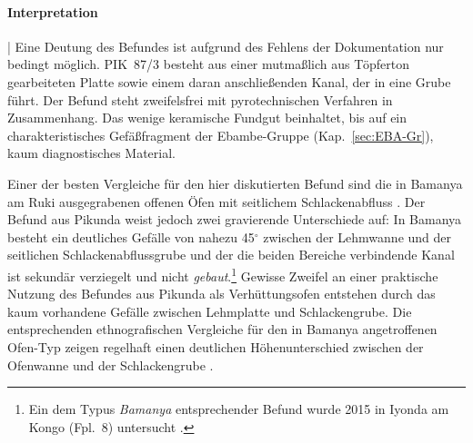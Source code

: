 \paragraph{Interpretation}\hspace{-.5em}|\hspace{.5em}%
Eine Deutung des Befundes ist aufgrund des Fehlens der Dokumentation nur bedingt möglich. PIK~87/3 besteht aus einer mutmaßlich aus Töpferton gearbeiteten Platte sowie einem daran anschließenden Kanal, der in eine Grube führt. Der Befund steht zweifelsfrei mit pyrotechnischen Verfahren in Zusammenhang. Das wenige keramische Fundgut beinhaltet, bis auf ein charakteristisches Gefäßfragment der Ebambe-Gruppe (Kap.~\ref{sec:EBA-Gr}), kaum diagnostisches Material.

Einer der besten Vergleiche für den hier diskutierten Befund sind die in Bamanya am Ruki ausgegrabenen offenen Öfen mit seitlichem Schlackenabfluss \parencites[siehe][3235--3237]{Eggert.1987}[54\,f. Karte 1, Fpl.~12]{Wotzka.1995}. Der Befund aus Pikunda weist jedoch zwei gravierende Unterschiede auf: In Bamanya besteht ein deutliches Gefälle von nahezu 45$^\circ$ zwischen der Lehmwanne und der seitlichen Schlackenabflussgrube \parencite[siehe][3236 Abb. oben]{Eggert.1987} und der die beiden Bereiche verbindende Kanal ist sekundär verziegelt und nicht \textit{gebaut}.\footnote{Ein dem Typus \textit{Bamanya} entsprechender Befund wurde 2015 in Iyonda am Kongo (Fpl.~8) untersucht \parencite{Jungnickel.2016}.} Gewisse Zweifel an einer praktische Nutzung des Befundes aus Pikunda als Verhüttungsofen entstehen durch das kaum vorhandene Gefälle zwischen Lehmplatte und Schlackengrube. Die entsprechenden ethnografischen Vergleiche für den in Bamanya angetroffenen Ofen-Typ zeigen regelhaft einen deutlichen Höhenunterschied zwischen der Ofenwanne und der Schlackengrube \parencites{vanNoten.1974}{Celis.1987}{Ackerman.1999}.